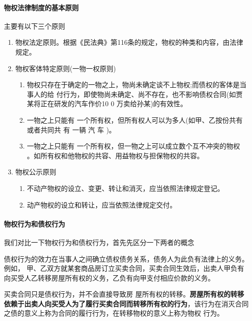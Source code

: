 \documentclass[UTF8,12pt]{ctexart}
\numberwithin{equation}{section} %
\numberwithin{figure}{section}
\numberwithin{table}{section}
\begin{document}
	\paragraph{物权法律制度的基本原则}
	主要有以下三个原则
	\begin{enumerate}
		\item 物权法定原则。根据《民法典》第116条的规定，物权的种类和内容，由法律规定。
		
		\item 物权客体特定原则(一物一权原则)
		\begin{enumerate}
			\item 物权只存在于确定的一物之上，物尚未确定谈不上物权;而债权的客体是当事人的给 付行为，即使物尚未确定、尚不存在，也不影响债权合同(如贾某将正在研发的汽车作价10 0 万卖给孙某)的有效性。
			
			\item 一物之上只能有 一个所有权，但所有权人可以为多人(如甲、乙按份共有或者共同共 有 一辆 汽 车 )。
			
			\item 一物之上只能有 一个所有权，但一物之上可以成立数个互不冲突的物权 。如所有权和他物权的共容、用益物权与担保物权的共容。
		\end{enumerate}
		
		\item 物权公示原则
		\begin{enumerate}
			\item 不动产物权的设立、变更、转让和消灭，应当依照法律规定登记。
			
			\item 动产物权的设立和转让，应当依照法律规定交付。
		\end{enumerate}
	\end{enumerate}
	
	\paragraph{物权行为和债权行为}
	我们对比一下物权行为和债权行为，首先先区分一下两者的概念
	
	债权行为的效力在当事人之间确立债权债务关系，债务人为此负有法律上的义务。例如， 甲、乙双方就某套商品房订立买卖合同，买卖合同生效后，出卖人甲负有向买受人乙转移房屋所有权的义务，乙负有向甲支付相应价款的义务。
	
	买卖合同只是债权行为，并不会直接导致房 屋所有权的转移。\textbf{房屋所有权的转移依赖于出卖人向买受人为了履行买卖合同而转移所有权的行为}，该行为在消灭合同之债的意义上称为合同的履行行为，在转移物权的意义上称为物权 行为。
	
\end{document}
